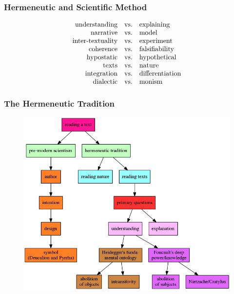 \documentclass[xcolor=dvipsnames]{beamer}
\begin{document}
\begin{frame}
  \frametitle{Hermeneutic and Scientific Method}
  \begin{equation}
    \label{eq:paumatae}
    \begin{array}{rcl}
      \mbox{understanding} & \mbox{vs.} & \mbox{explaining} \\
      \mbox{narrative} & \mbox{vs.} & \mbox{model} \\
      \mbox{inter-textuality} & \mbox{vs.} & \mbox{experiment} \\
      \mbox{coherence} & \mbox{vs.} & \mbox{falsifiability} \\
      \mbox{hypostatic} & \mbox{vs.} & \mbox{hypothetical} \\
      \mbox{texts} & \mbox{vs.} & \mbox{nature} \\
      \mbox{integration} & \mbox{vs.} & \mbox{differentiation} \\
      \mbox{dialectic} & \mbox{vs.} & \mbox{monism} \\
    \end{array}\notag
  \end{equation}
\end{frame}

\begin{frame}
  \frametitle{The Hermeneutic Tradition}
\begin{figure}[h]
\includegraphics[scale=.32]{./subob.png}
\end{figure}
\end{frame}
\end{document}
